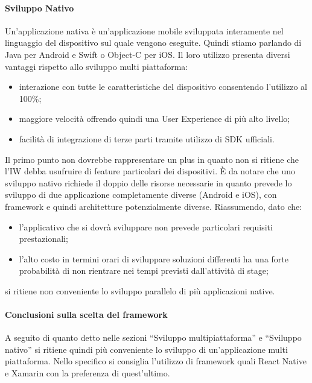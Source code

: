\paragraph{Sviluppo Nativo}
Un’applicazione nativa è un’applicazione mobile sviluppata interamente nel linguaggio del dispositivo sul quale vengono eseguite. Quindi stiamo parlando di Java per Android e Swift o Object-C per iOS. Il loro utilizzo presenta diversi vantaggi rispetto allo sviluppo multi piattaforma:
\begin{itemize}
    \item interazione con tutte le caratteristiche del dispositivo consentendo l’utilizzo al 100\%;
    \item maggiore velocità offrendo quindi una User Experience di più alto livello;
    \item facilità di integrazione di terze parti tramite utilizzo di SDK ufficiali. 
\end{itemize}
Il primo punto non dovrebbe rappresentare un plus in quanto non si ritiene che l’IW debba usufruire di feature particolari dei dispositivi. 
È da notare che uno sviluppo nativo richiede il doppio delle risorse necessarie in quanto prevede lo sviluppo di due applicazione completamente diverse (Android e iOS), con framework e quindi architetture potenzialmente diverse. 
Riassumendo, dato che: 
\begin{itemize}
    \item l’applicativo che si dovrà sviluppare non prevede particolari requisiti prestazionali;
    \item l’alto costo in termini orari di sviluppare soluzioni differenti ha una forte probabilità di non rientrare nei tempi previsti dall’attività di stage;
\end{itemize}
 si ritiene non conveniente lo sviluppo parallelo di più applicazioni native. 
\paragraph{Conclusioni sulla scelta del framework}
A seguito di quanto detto nelle sezioni “Sviluppo multipiattaforma” e “Sviluppo nativo” si ritiene quindi più conveniente lo sviluppo di un’applicazione multi piattaforma. Nello specifico si consiglia l’utilizzo di framework quali React Native e Xamarin con la preferenza di quest’ultimo.

